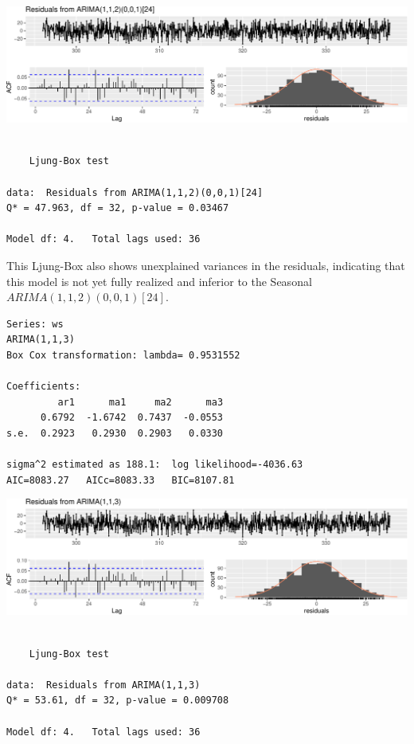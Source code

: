 \documentclass[openany]{book}
\begin{document}
\includegraphics{Group2_Project1_Fall2019_files/figure-latex/unnamed-chunk-24-1.pdf}

\begin{verbatim}

    Ljung-Box test

data:  Residuals from ARIMA(1,1,2)(0,0,1)[24]
Q* = 47.963, df = 32, p-value = 0.03467

Model df: 4.   Total lags used: 36
\end{verbatim}

This Ljung-Box also shows unexplained variances in the residuals,
indicating that this model is not yet fully realized and inferior to the
Seasonal \(ARIMA (1,1,2)(0,0,1)[24]\).

\begin{verbatim}
Series: ws 
ARIMA(1,1,3) 
Box Cox transformation: lambda= 0.9531552 

Coefficients:
         ar1      ma1     ma2      ma3
      0.6792  -1.6742  0.7437  -0.0553
s.e.  0.2923   0.2930  0.2903   0.0330

sigma^2 estimated as 188.1:  log likelihood=-4036.63
AIC=8083.27   AICc=8083.33   BIC=8107.81
\end{verbatim}

\includegraphics{Group2_Project1_Fall2019_files/figure-latex/unnamed-chunk-25-1.pdf}

\begin{verbatim}

    Ljung-Box test

data:  Residuals from ARIMA(1,1,3)
Q* = 53.61, df = 32, p-value = 0.009708

Model df: 4.   Total lags used: 36
\end{verbatim}
\end{document}
